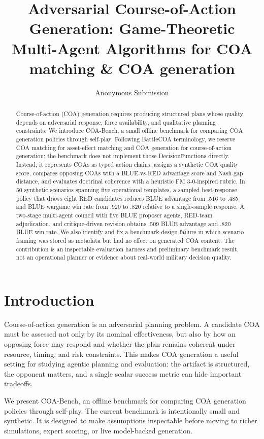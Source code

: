 \documentclass[letterpaper]{article}
\title{Adversarial Course-of-Action Generation: Game-Theoretic Multi-Agent Algorithms for COA matching \& COA generation}
\author{Anonymous Submission}
\begin{document}
\maketitle

\begin{abstract}
Course-of-action (COA) generation requires producing structured plans whose quality depends on adversarial response, force availability, and qualitative planning constraints. We introduce COA-Bench, a small offline benchmark for comparing COA generation policies through self-play. Following BattleCOA terminology, we reserve COA matching for asset-effect matching and COA generation for course-of-action generation; the benchmark does not implement those DecisionFunctions directly. Instead, it represents COAs as typed action chains, assigns a synthetic COA quality score, compares opposing COAs with a BLUE-vs-RED advantage score and Nash-gap distance, and evaluates doctrinal coherence with a heuristic FM 3-0-inspired rubric. In 50 synthetic scenarios spanning five operational templates, a sampled best-response policy that draws eight RED candidates reduces BLUE advantage from .516 to .485 and BLUE wargame win rate from .920 to .820 relative to a single-sample response. A two-stage multi-agent council with five BLUE proposer agents, RED-team adjudication, and critique-driven revision obtains .509 BLUE advantage and .820 BLUE win rate. We also identify and fix a benchmark-design failure in which scenario framing was stored as metadata but had no effect on generated COA content. The contribution is an inspectable evaluation harness and preliminary benchmark result, not an operational planner or evidence about real-world military decision quality.
\end{abstract}

\section{Introduction}

Course-of-action generation is an adversarial planning problem. A candidate COA must be assessed not only by its nominal effectiveness, but also by how an opposing force may respond and whether the plan remains coherent under resource, timing, and risk constraints. This makes COA generation a useful setting for studying agentic planning and evaluation: the artifact is structured, the opponent matters, and a single scalar success metric can hide important tradeoffs.

We present COA-Bench, an offline benchmark for comparing COA generation policies through self-play. The current benchmark is intentionally small and synthetic. It is designed to make assumptions inspectable before moving to richer simulations, expert scoring, or live model-backed generation.
\end{document}
